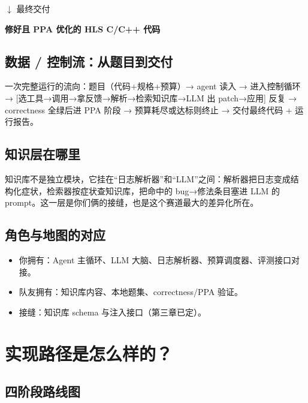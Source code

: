 \documentclass[12pt,a4paper]{ctexbook}
\begin{document}
\vspace{4pt}
\begin{center}\large $\downarrow$ 最终交付\end{center}
\vspace{4pt}

\begin{tipbox}
\textbf{修好且 PPA 优化的 HLS C/C++ 代码}
\end{tipbox}

\section{数据 / 控制流：从题目到交付}

一次完整运行的流向：题目（代码+规格+预算）→ agent 读入 → 进入控制循环 → [选工具→调用→拿反馈→解析→检索知识库→LLM 出 patch→应用] 反复 → correctness 全绿后进 PPA 阶段 → 预算耗尽或达标则终止 → 交付最终代码 + 运行报告。

\section{知识层在哪里}

知识库不是独立模块，它挂在“日志解析器”和“LLM”之间：解析器把日志变成结构化症状，检索器按症状查知识库，把命中的 bug→修法条目塞进 LLM 的 prompt。这一层是你们俩的接缝，也是这个赛道最大的差异化所在。

\section{角色与地图的对应}

\begin{itemize}
\item 你拥有：Agent 主循环、LLM 大脑、日志解析器、预算调度器、评测接口对接。
\item 队友拥有：知识库内容、本地题集、correctness/PPA 验证。
\item 接缝：知识库 schema 与注入接口（第三章已定）。
\end{itemize}

\chapter{实现路径是怎么样的？}

\section{四阶段路线图}
\end{document}
